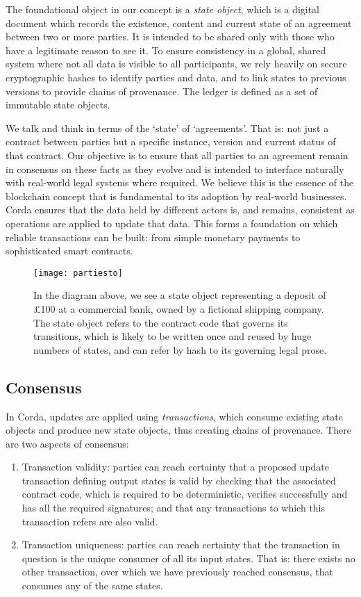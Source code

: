 \documentclass{article}
\begin{document}
The foundational object in our concept is a \textit{state object}, which is a digital document which records the existence, content and current state of an agreement between two or more parties. It is intended to be shared only with those who have a legitimate reason to see it. To ensure consistency in a global, shared system where not all data is visible to all participants, we rely heavily on secure cryptographic hashes to identify parties and data, and to link states to previous versions to provide chains of provenance. The ledger is defined as a set of immutable state objects.

We talk and think in terms of the `state' of `agreements'. That is: not just a contract between parties but a specific instance, version and current status of that contract. Our objective is to ensure that all parties to an agreement remain in consensus on these facts as they evolve and is intended to interface naturally with real-world legal systems where required. We believe this is the essence of the blockchain concept that is fundamental to its adoption by real-world businesses. Corda ensures that the data held by different actors is, and remains, consistent as operations are applied to update that data. This forms a foundation on which reliable transactions can be built: from simple monetary payments to sophisticated smart contracts.

\begin{figure}[H]
\texttt{[image: partiesto]}
\caption{In the diagram above, we see a state object representing a deposit of \pounds100 at a commercial bank, owned by a fictional shipping company. The state object refers to the contract code that governs its transitions, which is likely to be written once and reused by huge numbers of states, and can refer by hash to its governing legal prose.}
\end{figure}

\subsection{Consensus}
In Corda, updates are applied using \textit{transactions}, which consume existing state objects and produce new state objects, thus creating chains of provenance. There are two aspects of consensus:
\begin{enumerate}
\item{Transaction validity: parties can reach certainty that a proposed update transaction defining output states is valid by checking that the associated contract code, which is required to be deterministic, verifies successfully and has all the required signatures; and that any transactions to which this transaction refers are also valid.}
\item{Transaction uniqueness: parties can reach certainty that the transaction in question is the unique consumer of all its input states. That is: there exists no other transaction, over which we have previously reached consensus, that consumes any of the same states.}
\end{enumerate}
\end{document}
